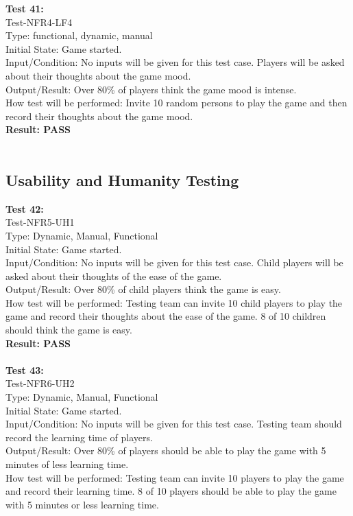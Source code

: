\documentclass[12pt, titlepage]{article}
\begin{document}
\textbf{Test 41:}\\
Test-NFR4-LF4\\
Type: functional, dynamic, manual\\
Initial State: Game started.\\
Input/Condition: No inputs will be given for this 
test case. Players will be asked about their thoughts
about the game mood.\\
Output/Result: Over 80\% of players think the game
mood is intense.\\
How test will be performed: Invite 10 random persons to
play the game and then record their thoughts about the
game mood.\\
\textbf{Result: PASS}\\\\

\subsection{Usability and Humanity Testing}
\textbf{Test 42:}\\
Test-NFR5-UH1\\
Type: Dynamic, Manual, Functional\\
Initial State: Game started.\\
Input/Condition: No inputs will be given for this test
case. Child players will be asked about their thoughts
of the ease of the game.\\
Output/Result: Over 80\% of child players think the game is easy.\\
How test will be performed: Testing team can invite
10 child players to play the game and record their 
thoughts about the ease of the game. 8 of 10 children
should think the game is easy.\\
\textbf{Result: PASS}\\\\
\textbf{Test 43:}\\
Test-NFR6-UH2\\
Type: Dynamic, Manual, Functional\\
Initial State: Game started.\\
Input/Condition: No inputs will be given for this 
test case. Testing team should record the learning time
of players.\\
Output/Result: Over 80\% of players should be able to 
play the game with 5 minutes of less learning time.\\
How test will be performed:  Testing team can invite
10 players to play the game and record their learning time. 8 of 10 players should be able to play the game with 5 minutes or less learning time.\\
\end{document}
